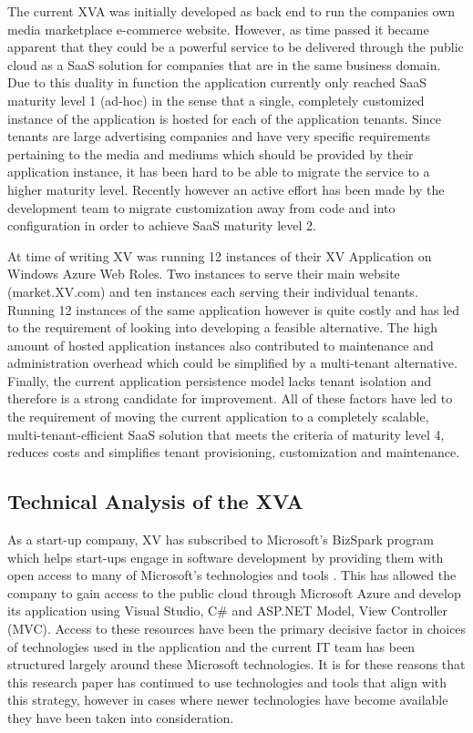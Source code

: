 The current XVA was initially developed as back end to run the companies own media marketplace e-commerce website. However, as time passed it became apparent that they could be a powerful service to be delivered through the public cloud as a SaaS solution for companies that are in the same business domain. Due to this duality in function the application currently only reached SaaS maturity level 1 (ad-hoc) \cite{Chong2006} in the sense that a single, completely customized instance of the application is hosted for each of the application tenants. Since tenants are large advertising companies and have very specific requirements pertaining to the media and mediums which should be provided by their application instance, it has been hard to be able to migrate the service to a higher maturity level. Recently however an active effort has been made by the development team to migrate customization away from code and into configuration in order to achieve SaaS maturity level 2.
 
 
 
At time of writing XV was running 12 instances of their XV Application on Windows Azure Web Roles. Two instances to serve their main website (market.XV.com) and ten instances each serving their individual tenants. Running 12 instances of the same application however is quite costly and has led to the requirement of looking into developing a feasible alternative. The high amount of hosted application instances also contributed to maintenance and administration overhead which could be simplified by a multi-tenant alternative. Finally, the current application persistence model lacks tenant isolation and therefore is a strong candidate for improvement. All of these factors have led to the requirement of moving the current application to a completely scalable, multi-tenant-efficient SaaS solution that meets the criteria of maturity level 4, reduces costs and simplifies tenant provisioning, customization and maintenance.




\subsection{Technical Analysis of the XVA}
\label{sec:techconst}
As a start-up company, XV has subscribed to Microsoft's BizSpark program which helps start-ups engage in software development by providing them with open access to many of Microsoft's technologies and tools \cite{BizSpark}. This has allowed the company to gain access to the public cloud through Microsoft Azure and develop its application using Visual Studio, C\# and ASP.NET Model, View Controller (MVC). Access to these resources have been the primary decisive factor in choices of technologies used in the application and the current IT team has been structured largely around these Microsoft technologies. It is for these reasons that this research paper has continued to use technologies and tools that align with this strategy, however in cases where newer technologies have become available they have been taken into consideration.
 
